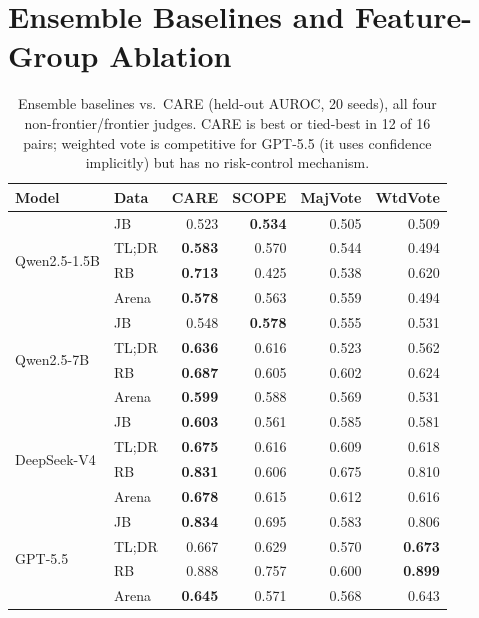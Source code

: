 \section{Ensemble Baselines and Feature-Group Ablation}
\label{app:ensemble}

\begin{table}[t]
\centering
\small
\setlength{\tabcolsep}{3.2pt}
\caption{Ensemble baselines vs.\ CARE (held-out AUROC, 20 seeds), all four non-frontier/frontier judges. CARE is best or tied-best in 12 of 16 pairs; weighted vote is competitive for GPT-5.5 (it uses confidence implicitly) but has no risk-control mechanism.}
\label{tab:ensemble}
\begin{tabular}{llrrrr}
\toprule
Model & Data & \textbf{CARE} & SCOPE & MajVote & WtdVote \\
\midrule
\multirow{4}{*}{Qwen2.5-1.5B} & JB & 0.523 & \textbf{0.534} & 0.505 & 0.509 \\
 & TL;DR & \textbf{0.583} & 0.570 & 0.544 & 0.494 \\
 & RB & \textbf{0.713} & 0.425 & 0.538 & 0.620 \\
 & Arena & \textbf{0.578} & 0.563 & 0.559 & 0.494 \\
\midrule
\multirow{4}{*}{Qwen2.5-7B} & JB & 0.548 & \textbf{0.578} & 0.555 & 0.531 \\
 & TL;DR & \textbf{0.636} & 0.616 & 0.523 & 0.562 \\
 & RB & \textbf{0.687} & 0.605 & 0.602 & 0.624 \\
 & Arena & \textbf{0.599} & 0.588 & 0.569 & 0.531 \\
\midrule
\multirow{4}{*}{DeepSeek-V4} & JB & \textbf{0.603} & 0.561 & 0.585 & 0.581 \\
 & TL;DR & \textbf{0.675} & 0.616 & 0.609 & 0.618 \\
 & RB & \textbf{0.831} & 0.606 & 0.675 & 0.810 \\
 & Arena & \textbf{0.678} & 0.615 & 0.612 & 0.616 \\
\midrule
\multirow{4}{*}{GPT-5.5} & JB & \textbf{0.834} & 0.695 & 0.583 & 0.806 \\
 & TL;DR & 0.667 & 0.629 & 0.570 & \textbf{0.673} \\
 & RB & 0.888 & 0.757 & 0.600 & \textbf{0.899} \\
 & Arena & \textbf{0.645} & 0.571 & 0.568 & 0.643 \\
\bottomrule
\end{tabular}
\end{table}

